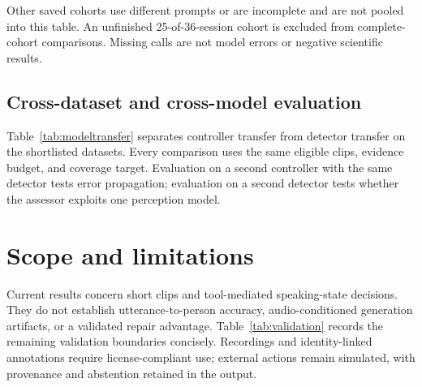 \begin{table}[t]
\centering\small
\caption{Completed tool-only Qwen3.8-27B cohort. Repeated, corrected, and abstained counts partition tool errors. No agent errors were introduced on tool-correct opportunities in this cohort.}
\label{tab:agent}
\setlength{\tabcolsep}{3pt}
\end{table}

Other saved cohorts use different prompts or are incomplete and are not pooled into this table. An unfinished 25-of-36-session cohort is excluded from complete-cohort comparisons. Missing calls are not model errors or negative scientific results. 

\subsection{Cross-dataset and cross-model evaluation}
Table~\ref{tab:modeltransfer} separates controller transfer from detector transfer on the shortlisted datasets. Every comparison uses the same eligible clips, evidence budget, and coverage target. Evaluation on a second controller with the same detector tests error propagation; evaluation on a second detector tests whether the assessor exploits one perception model. 

\section{Scope and limitations}
Current results concern short clips and tool-mediated speaking-state decisions. They do not establish utterance-to-person accuracy, audio-conditioned generation artifacts, or a validated repair advantage. Table~\ref{tab:validation} records the remaining validation boundaries concisely. Recordings and identity-linked annotations require license-compliant use; external actions remain simulated, with provenance and abstention retained in the output.

